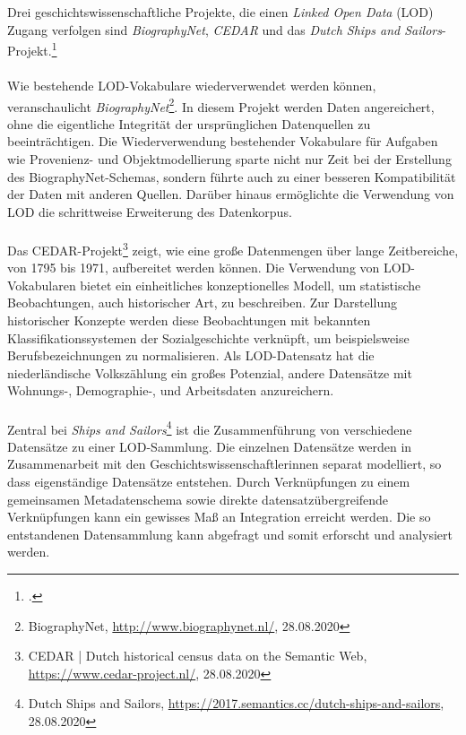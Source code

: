 \documentclass[12pt,a4paper]{article}
\begin{document}
Drei geschichtswissenschaftliche Projekte, die einen \textit{Linked Open Data} (LOD) Zugang verfolgen sind \textit{BiographyNet}, \textit{CEDAR} und das \textit{Dutch Ships and Sailors}-Projekt.\footcite[][S.5-22]{de2016linked}
\\
\\
Wie bestehende LOD-Vokabulare wiederverwendet werden können, veranschaulicht \textit{BiographyNet}\footnote{BiographyNet, \url{http://www.biographynet.nl/}, 28.08.2020}. In diesem Projekt werden Daten angereichert, ohne die eigentliche Integrität der ursprünglichen Datenquellen zu beeinträchtigen. Die Wiederverwendung bestehender Vokabulare für Aufgaben wie Provenienz- und Objektmodellierung sparte nicht nur Zeit bei der Erstellung des BiographyNet-Schemas, sondern führte auch zu einer besseren Kompatibilität der Daten mit anderen Quellen. Darüber hinaus ermöglichte die Verwendung von LOD die schrittweise Erweiterung des Datenkorpus.
\\
\\
Das CEDAR-Projekt\footnote{CEDAR | Dutch historical census data on the Semantic Web, \url{https://www.cedar-project.nl/}, 28.08.2020} zeigt, wie eine große Datenmengen über lange Zeitbereiche, von 1795 bis 1971, aufbereitet werden können. Die Verwendung von LOD-Vokabularen bietet ein einheitliches konzeptionelles Modell, um statistische Beobachtungen, auch historischer Art, zu beschreiben. Zur Darstellung historischer Konzepte werden diese Beobachtungen mit bekannten Klassifikationssystemen der Sozialgeschichte verknüpft, um beispielsweise Berufsbezeichnungen zu normalisieren. Als LOD-Datensatz hat die niederländische Volkszählung ein großes Potenzial, andere Datensätze mit Wohnungs-, Demographie-, und Arbeitsdaten anzureichern.
\\
\\ 
Zentral bei \textit{Ships and Sailors}\footnote{Dutch Ships and Sailors, \url{https://2017.semantics.cc/dutch-ships-and-sailors}, 28.08.2020} ist die Zusammenführung von verschiedene Datensätze zu einer LOD-Sammlung. Die einzelnen Datensätze werden in Zusammenarbeit mit den Geschichtswissenschaftlerinnen separat modelliert, so dass eigenständige Datensätze entstehen. Durch Verknüpfungen zu einem gemeinsamen Metadatenschema sowie direkte datensatzübergreifende Verknüpfungen kann ein gewisses Maß an Integration erreicht werden. Die so entstandenen Datensammlung kann abgefragt und somit erforscht und analysiert werden.  



\newpage
\end{document}
